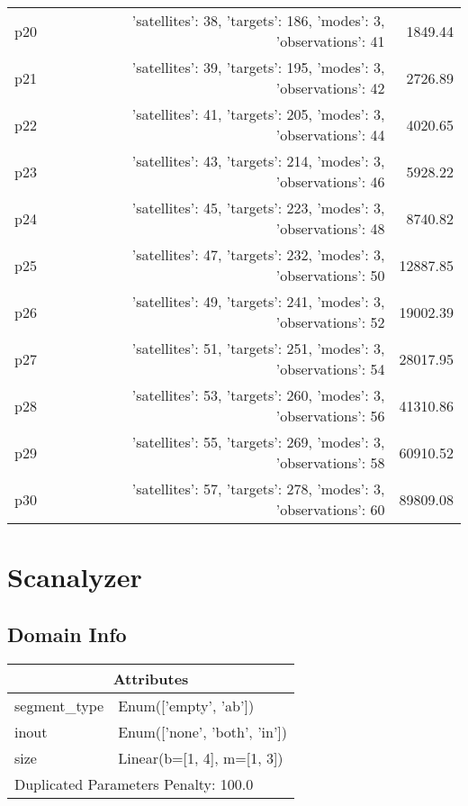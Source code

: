 \documentclass{article}
\begin{document}
\begin{center}
\begin{tabular}{@{}l|r|r@{}}
  p20&{'satellites': 38, 'targets': 186, 'modes': 3, 'observations': 41}&1849.44\\
  p21&{'satellites': 39, 'targets': 195, 'modes': 3, 'observations': 42}&2726.89\\
  p22&{'satellites': 41, 'targets': 205, 'modes': 3, 'observations': 44}&4020.65\\
  p23&{'satellites': 43, 'targets': 214, 'modes': 3, 'observations': 46}&5928.22\\
  p24&{'satellites': 45, 'targets': 223, 'modes': 3, 'observations': 48}&8740.82\\
  p25&{'satellites': 47, 'targets': 232, 'modes': 3, 'observations': 50}&12887.85\\
  p26&{'satellites': 49, 'targets': 241, 'modes': 3, 'observations': 52}&19002.39\\
  p27&{'satellites': 51, 'targets': 251, 'modes': 3, 'observations': 54}&28017.95\\
  p28&{'satellites': 53, 'targets': 260, 'modes': 3, 'observations': 56}&41310.86\\
  p29&{'satellites': 55, 'targets': 269, 'modes': 3, 'observations': 58}&60910.52\\
  p30&{'satellites': 57, 'targets': 278, 'modes': 3, 'observations': 60}&89809.08
                            \end{tabular}
                            \end{center}
                    
                            \newpage \section{Scanalyzer}
                    \subsection*{Domain Info}

                    \begin{center}
                    \begin{tabular}{@{}p{}p{}@{}}
                    \multicolumn{2}{c}{\bf \large Attributes}\\\midrule
                    segment\_type & Enum(['empty', 'ab'])\\
inout & Enum(['none', 'both', 'in'])\\
size & Linear(b=[1, 4], m=[1, 3])
                    
                     \\\midrule
                    \multicolumn{2}{l}{Duplicated Parameters Penalty: 100.0}
                    \end{tabular}
                    \end{center}
                
\end{document}
